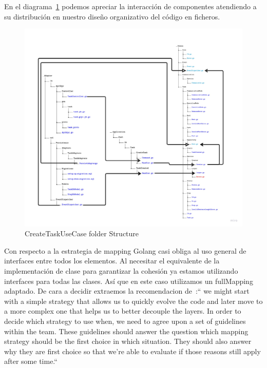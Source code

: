 En el diagrama~\cref{fig:createTaskUseCaseArchitectureFolderStructure} podemos apreciar la interacción de componentes atendiendo a su distribución en nuestro diseño organizativo del código en ficheros.

\begin{figure}[H]
    \centering
    \includegraphics[height=0.5\textheight]{./part/Ejecucion/Seguimiento/CreateTaskUseCase/img/PFM - CreateUseCaseFolderStructure}
    \caption{CreateTaskUseCase folder Structure}\label{fig:createTaskUseCaseArchitectureFolderStructure}
\end{figure}

Con respecto a la estrategia de mapping Golang casi obliga al uso general de interfaces entre todos los elementos. Al necesitar el equivalente de la implementación de clase para garantizar la cohesión ya estamos utilizando interfaces para todas las clases. Así que en este caso utilizamos un fullMapping adaptado. De cara a decidir extraemos la recomendacion de~\cite{TomHombergs2019GYHD}:“
we might start with a simple strategy that allows us to quickly evolve the code and later move to a more complex one that helps us to better decouple the layers. In order to decide which strategy to use when, we need to agree upon a set of guidelines within the team. These guidelines should answer the question which mapping strategy should be the first choice in which situation. They should also answer why they are first choice so that we’re able to evaluate if those reasons still apply after some time.“

